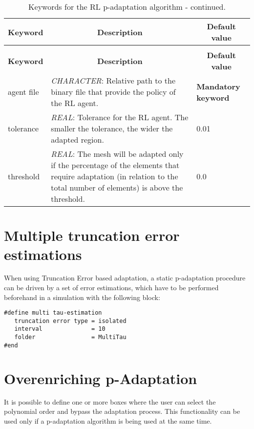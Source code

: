 \documentclass[a4paper,10pt]{report}
\begin{document}
\begin{longtable}{|p{4cm}|p{10cm}|p{2.2cm}|}
\caption{Keywords for the RL p-adaptation algorithm.} \label{tab:RLpAdaptationKey} \\
\hline
\multicolumn{1}{|c|}{\textbf{Keyword}} & \multicolumn{1}{c|}{\textbf{Description}} & \multicolumn{1}{c|}{\textbf{Default value}} \\ \hline
\endfirsthead

\caption{Keywords for the RL p-adaptation algorithm - continued.} \\
\hline
\multicolumn{1}{|c|}{\textbf{Keyword}} & \multicolumn{1}{c|}{\textbf{Description}} & \multicolumn{1}{c|}{\textbf{Default value}} \\ \hline
\endhead

agent file & \textit{CHARACTER}: Relative path to the binary file that provide the policy of the RL agent. & \textbf{Mandatory keyword} \\ \hline

tolerance & \textit{REAL}: Tolerance for the RL agent. The smaller the tolerance, the wider the adapted region. & 0.01 \\ \hline

threshold & \textit{REAL}: The mesh will be adapted only if the percentage of the elements that require adaptation (in relation to the total number of elements) is above the threshold. & 0.0 \\ \hline


\end{longtable}


\section{Multiple truncation error estimations} \label{sec:MultiTau}
When using Truncation Error based adaptation, a static p-adaptation procedure can be driven by a set of error estimations, which have to be performed beforehand in a simulation with the following block:

\begin{lstlisting}
#define multi tau-estimation
   truncation error type = isolated
   interval              = 10
   folder                = MultiTau
#end
\end{lstlisting}

\section{Overenriching p-Adaptation}
It is possible to define one or more boxes where the user can select the polynomial order and bypass the adaptation process. This functionality can be used only if a p-adaptation algorithm is being used at the same time.
\end{document}

